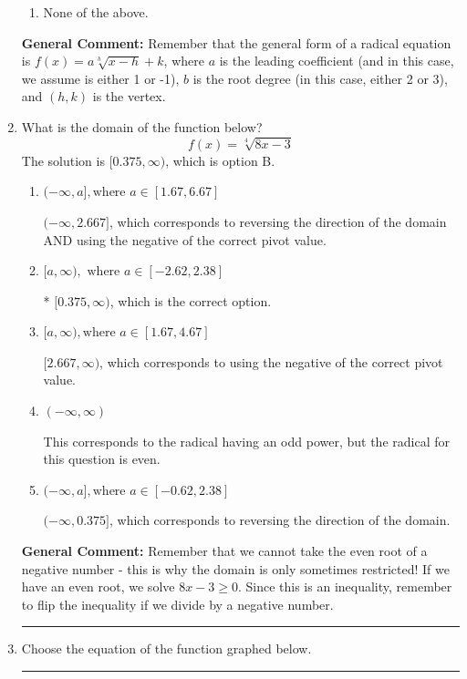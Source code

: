 \documentclass{extbook}[14pt]
\newcommand{\litem}[1]{\item #1

\rule{\textwidth}{0.4pt}}
\begin{document}
\begin{enumerate}
{\begin{enumerate}[label=\Alph*.]
\item None of the above.\end{enumerate}
\textbf{General Comment:} Remember that the general form of a radical equation is $ f(x) = a \sqrt[b]{x - h} + k $, where $a$ is the leading coefficient (and in this case, we assume is either 1 or -1), $b$ is the root degree (in this case, either 2 or 3), and $(h, k)$ is the vertex.
}
\litem{
What is the domain of the function below?
\[ f(x) = \sqrt[4]{8 x - 3} \]The solution is \( [0.375, \infty) \), which is option B.\begin{enumerate}[label=\Alph*.]
\item \( (-\infty, a], \text{where } a \in [1.67, 6.67] \)

$(-\infty, 2.667]$, which corresponds to reversing the direction of the domain AND using the negative of the correct pivot value.
\item \( [a, \infty), \text{ where } a \in [-2.62, 2.38] \)

* $[0.375, \infty)$, which is the correct option.
\item \( [a, \infty), \text{where } a \in [1.67, 4.67] \)

$[2.667, \infty)$, which corresponds to using the negative of the correct pivot value.
\item \( (-\infty, \infty) \)

This corresponds to the radical having an odd power, but the radical for this question is even.
\item \( (-\infty, a], \text{where } a \in [-0.62, 2.38] \)

 $(-\infty, 0.375]$, which corresponds to reversing the direction of the domain.
\end{enumerate}

\textbf{General Comment:} Remember that we cannot take the even root of a negative number - this is why the domain is only sometimes restricted! If we have an even root, we solve $8 x - 3 \geq 0$. Since this is an inequality, remember to flip the inequality if we divide by a negative number.
}
\litem{
Choose the equation of the function graphed below.

}
\end{enumerate}
\end{document}
